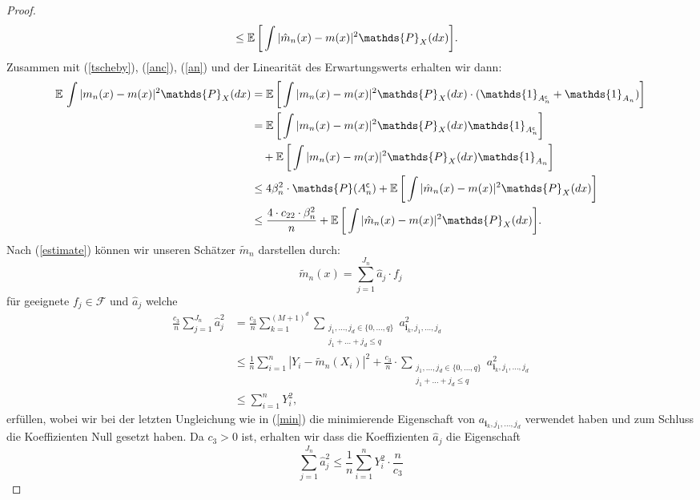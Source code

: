 \begin{proof}
\begin{equation}
\begin{split}
& \leq \E \bigg[\int |\hat{m}_n(x) - m(x)|^2 \mathds{P}_X(dx)\bigg].
\end{split}
\end{equation}
Zusammen mit (\ref{tscheby}), (\ref{anc}), (\ref{an}) und der Linearität des Erwartungswerts erhalten wir dann:
\begin{equation}
\label{originaleq}
\begin{split}
\E \int |m_n(x) - m(x)|^2 \mathds{P}_X(dx) & = \E \bigg[\int |m_n(x) - m(x)|^2 \mathds{P}_X(dx) \cdot (\mathds{1}_{A_n^{\mathsf{c}}} + \mathds{1}_{A_n})\bigg] \\
& = \E \bigg[\int |m_n(x) - m(x)|^2 \mathds{P}_X(dx) \mathds{1}_{A_n^{\mathsf{c}}}\bigg] \\
& \quad + \E \bigg[\int |m_n(x) - m(x)|^2 \mathds{P}_X(dx) \mathds{1}_{A_n}\bigg] \\
& \leq 4\beta_n^2 \cdot \mathds{P}(A_n^{\mathsf{c}}) + \E \bigg[\int |\hat{m}_n(x) - m(x)|^2 \mathds{P}_X(dx)\bigg] \\
& \leq \frac{4 \cdot c_{22} \cdot \beta_n^2}{n} + \E \bigg[\int |\hat{m}_n(x) - m(x)|^2 \mathds{P}_X(dx)\bigg].
\end{split}
\end{equation}
Nach (\ref{estimate}) können wir unseren Schätzer $\tilde{m}_n$ darstellen durch:
$$\tilde{m}_n(x) = \sum_{j = 1}^{J_n}\hat{a}_j \cdot f_j$$
für geeignete $f_j \in \mathcal{F}$ und $\hat{a}_j$ welche 
\begin{equation*}
\begin{split}
\frac{c_3}{n}\sum_{j = 1}^{J_n} \hat{a}_j^2 & = \frac{c_3}{n} \sum_{k = 1}^{(M + 1)^d} \sum_{\substack{ j_1,\dots,j_d \in \{0,\dots,q\} \\j_1+\dots +j_d \leq q}} a_{\mathbf{i}_k,j_1,\dots,j_d}^2 \\
& \leq \frac{1}{n} \sum_{i = 1}^n|Y_i - \tilde{m}_n(X_i)|^2 + \frac{c_3}{n} \cdot \sum_{\substack{ j_1,\dots,j_d \in \{0,\dots,q\} \\j_1+\dots +j_d \leq q}} a_{\mathbf{i}_k,j_1,\dots,j_d}^2 \\
& \leq \sum_{i = 1}^n Y_i^2,
\end{split}
\end{equation*}
erfüllen, wobei wir bei der letzten Ungleichung wie in (\ref{min}) die minimierende Eigenschaft von $a_{\mathbf{i}_k,j_1,\dots,j_d}$ verwendet haben und zum Schluss die Koeffizienten Null gesetzt haben. Da $c_3 > 0$ ist, erhalten wir dass die Koeffizienten $\hat{a}_j$ die Eigenschaft
$$\sum_{j = 1}^{J_n} \hat{a}_j^2  \leq \frac{1}{n}\sum_{i = 1}^n Y_i^2 \cdot \frac{n}{c_3}$$

\end{proof}
